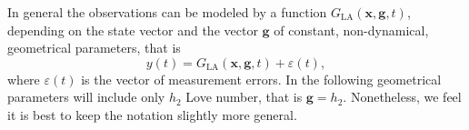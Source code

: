 \documentclass[lineno, pdflatex,sn-mathphys-ay]{sn-jnl}
\theoremstyle{thmstyleone}%
\theoremstyle{thmstyletwo}%
\theoremstyle{thmstylethree}%
\renewcommand{\vec}[1]{\boldsymbol{#1}}
\begin{document}
% 
In general the observations  can be modeled by a function ${G}_{\mathrm{LA}}(\vec{x}, \vec{g}, t )$, depending on the state vector and the vector $\vec{g}$ of constant, non-dynamical, geometrical parameters, that is
%
\begin{equation}\label{Y_eq1}
	{y}(t) = {G}_{\mathrm{LA}}(\vec{x}, \vec{g}, t ) + \varepsilon(t), %
\end{equation}
%
where 
$\varepsilon(t)$ is the vector of measurement errors.
In the following geometrical parameters will include only $h_2$ Love number, that is $\vec{g} = h_2$. Nonetheless, we feel it is best to keep the notation slightly more general.
	
\end{document}
